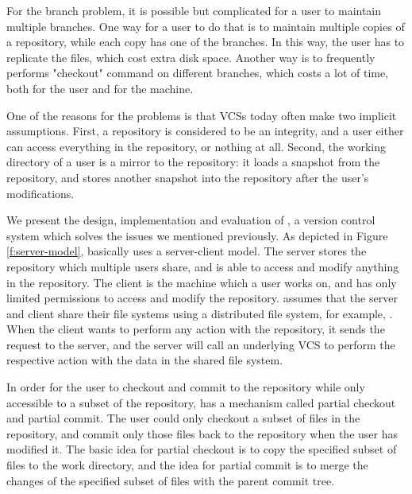 For the branch problem, it is possible but complicated for a user to maintain
multiple branches. One way for a user to do that is to maintain multiple copies
of a repository, while each copy has one of the branches. In this way, the user
has to replicate the files, which cost extra disk space. Another way is to
frequently performs "checkout" command on different branches, which costs a lot
of time, both for the user and for the machine.

One of the reasons for the problems is that VCSs today often
make two implicit assumptions. First, a repository is considered to be
an integrity, and a user either can access everything in the repository, or
nothing at all. Second, the working directory of a user is a mirror to the
repository: it loads a snapshot from the repository, and stores another snapshot
into the repository after the user's modifications. 



We present the design, implementation and evaluation of \sys, a version control
system which solves the issues we mentioned previously. As depicted in Figure
\ref{f:server-model}, \sys basically
uses a server-client model. The server stores the repository which multiple
users share, and is able to access and modify anything in the
repository. The client is the machine which a user works on, and has only
limited permissions to access and modify the repository. \sys assumes that the
server and client share their file systems using a distributed file system, for
example,
\nfs. %
When the client wants to perform any action with the repository, it sends the
request to the server, and the server will call an underlying VCS to perform
the respective action with the data in the shared file system.

In order for the user to checkout and commit to the repository while only
accessible to a subset of the repository, \sys has a mechanism called partial
checkout and partial commit. The user could only checkout a subset of files in
the repository, and commit only those files back to the repository when the user
has modified it. The basic idea for partial checkout is to copy the specified
subset of files to the work directory, and the idea for partial commit is to
merge the changes of the specified subset of files with the parent commit tree.

